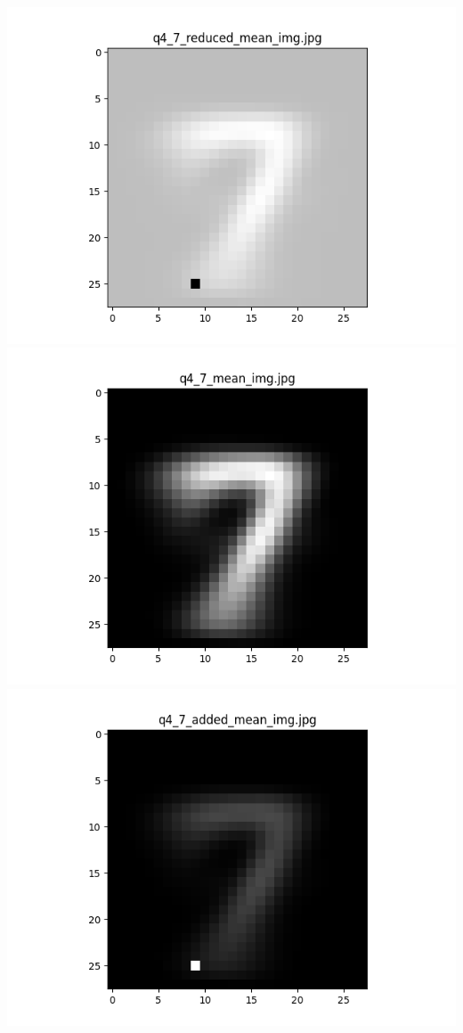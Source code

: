 \documentclass{article}
\begin{document}
    \\
    \includegraphics[scale=.37]{../results/q4/reduced_mean_images/q4_7_reduced_mean_img.png}
    \includegraphics[scale=.37]{../results/q4/mean_images/q4_7_mean_img.png}
    \includegraphics[scale=.37]{../results/q4/added_mean_images/q4_7_added_mean_img.png}
\end{document}
